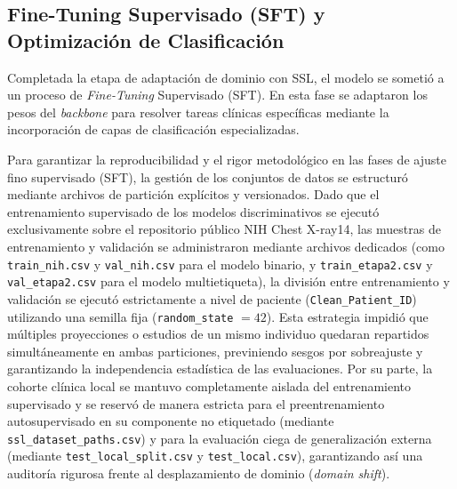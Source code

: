 \documentclass[../main.tex]{subfiles}
\begin{document}
\subsection{Fine-Tuning Supervisado (SFT) y Optimización de Clasificación}

Completada la etapa de adaptación de dominio con SSL, el modelo se sometió a un proceso de \textit{Fine-Tuning} Supervisado (SFT). En esta fase se adaptaron los pesos del \textit{backbone} para resolver tareas clínicas específicas mediante la incorporación de capas de clasificación especializadas.

Para garantizar la reproducibilidad y el rigor metodológico en las fases de ajuste fino supervisado (SFT), la gestión de los conjuntos de datos se estructuró mediante archivos de partición explícitos y versionados. Dado que el entrenamiento supervisado de los modelos discriminativos se ejecutó exclusivamente sobre el repositorio público NIH Chest X-ray14, las muestras de entrenamiento y validación se administraron mediante archivos dedicados (como \texttt{train\_nih.csv} y \texttt{val\_nih.csv} para el modelo binario, y \texttt{train\_etapa2.csv} y \texttt{val\_etapa2.csv} para el modelo multietiqueta), la división entre entrenamiento y validación se ejecutó estrictamente a nivel de paciente (\texttt{Clean\_Patient\_ID}) utilizando una semilla fija (\texttt{random\_state} $= 42$). Esta estrategia impidió que múltiples proyecciones o estudios de un mismo individuo quedaran repartidos simultáneamente en ambas particiones, previniendo sesgos por sobreajuste y garantizando la independencia estadística de las evaluaciones. Por su parte, la cohorte clínica local se mantuvo completamente aislada del entrenamiento supervisado y se reservó de manera estricta para el preentrenamiento autosupervisado en su componente no etiquetado (mediante \texttt{ssl\_dataset\_paths.csv}) y para la evaluación ciega de generalización externa (mediante \texttt{test\_local\_split.csv} y \texttt{test\_local.csv}), garantizando así una auditoría rigurosa frente al desplazamiento de dominio (\textit{domain shift}).
\end{document}
